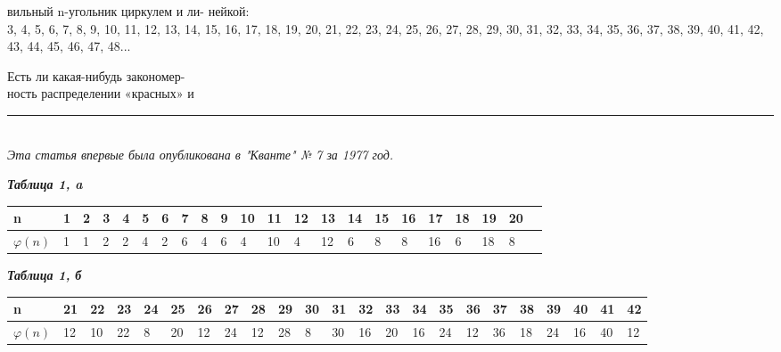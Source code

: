 \begin{vwcol}[widths={0.32,  0.67},  sep=.8cm,  justify=flush,  rule=0pt,indent=0em]
\justifying
вильный n-угольник циркулем и ли-
нейкой:
\\
3, 4, 5, 6, 7, 8, 9, 10, 11, 12, 13, 14,
15, 16, 17, 18, 19, 20, 21, 22, 23, 24,
25, 26, 27, 28, 29, 30, 31, 32, 33, 34,
35, 36, 37, 38, 39, 40, 41, 42, 43, 44,
45, 46, 47, 48...

Есть ли какая-нибудь закономер- \\
ность распределении «красных» и \\
\noindent\rule{3cm}{1pt} \\
\textit{\small \phantom{..}Эта статья впервые была опубликована в "Кванте" № 7 за 1977 год.}

\phantom{....}

\raggedleft
\textbf{\textit{Таблица 1,  a}}

\phantom{....}

\raggedright
\begin{tabular} { 
	| m{1.5em} | m{4pt} | m{4pt} | m{4pt} |  m{4pt} | m{4pt} | m{4pt} | m{4pt} | m{4pt} | m{4pt} | 
	m{5pt} | m{5pt} | m{5pt} | m{5pt} | m{5pt} | m{5pt} | m{5pt} | m{5pt} | m{5pt} | m{5pt} | m{5pt} | m{5pt} |
}
 \hline
 n & 1 & 2 & 3 & 4 & 5 & 6 & 7 & 8 & 9 & 10 & 11 & 12 & 13 & 14 & 15 & 16 & 17 & 18 & 19 & 20\\
 \hline
 $\varphi(n)$ & 1 & 1 & 2 & 2 & 4 & 2 & 6 & 4 & 6 & 4 & 10 & 4 & 12 & 6 & 8 & 8 & 16 & 6 & 18 & 8\\
\hline
\end{tabular}

\phantom{....}

\phantom{....}

\raggedleft
\textbf{\textit{Таблица 1,  б}}

\phantom{....}

\raggedright
\renewcommand{\tabcolsep}{5.5pt}
\begin{tabular} { 
	| m{1.37em} | m{4.5pt} | m{4.5pt} | m{5pt} | m{4.5pt} | m{5pt} | m{5pt} | m{4.5pt} | 
	 m{5pt} | m{5pt} | m{5pt} | m{4pt} | m{4.5pt} | m{5pt} |  m{4.5pt} | m{5pt} | 
	 m{5pt} | m{5pt} | m{5pt} | m{5pt} | m{5pt} | m{4.5pt} | m{4.5pt} | 
}
 \hline
 n & 21 & 22 & 23 & 24 & 25 & 26 &27 & 28 & 29 & 30 & 31 & 32 & 33 & 34 & 35 & 36 & 37 & 38 & 39 & 40 & 41 & 42\\
 \hline
 $\varphi(n)$ & 12 & 10 & 22 & 8 & 20 & 12 & 24 & 12 & 28 & 8 & 30 & 16 & 20 & 16 & 24 & 12 & 36 & 18 & 24 & 16 & 40 & 12\\
\hline
\end{tabular}
\end{vwcol}

